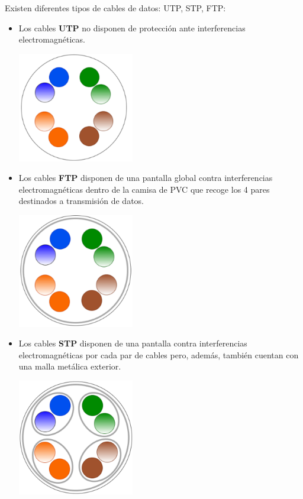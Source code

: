 Existen diferentes tipos de cables de datos: UTP, STP, FTP:
\begin{itemize}
\item Los cables \textbf{UTP} no disponen de protección ante interferencias electromagnéticas.
  \begin{center}
  \includegraphics[width=0.4\textwidth]{img/UTP.pdf}
  \end{center}

\item Los cables \textbf{FTP} disponen de una pantalla global contra interferencias electromagnéticas dentro de la camisa de PVC que recoge los 4 pares destinados a transmisión de datos.
  \begin{center}
  \includegraphics[width=0.4\textwidth]{img/FTP.pdf}
  \end{center}

\item Los cables \textbf{STP} disponen de una pantalla contra interferencias electromagnéticas por cada par de cables pero, además, también cuentan con una malla metálica exterior.
  \begin{center}
  \includegraphics[width=0.4\textwidth]{img/STP.pdf}
  \end{center}


\end{itemize}
